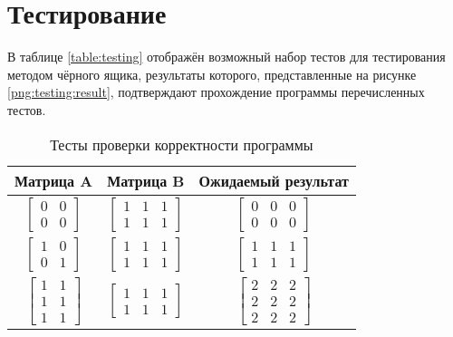         
    \section{Тестирование}
        В таблице \ref{table:testing} отображён возможный набор тестов
        для тестирования методом чёрного ящика, результаты которого, 
        представленные на рисунке \ref{png:testing:result}, подтверждают
        прохождение программы перечисленных тестов.

        \begin{table}[]
            \caption{Тесты проверки корректности программы}
            \centering
            \begin{tabular}{|c|c|c|}
                \hline
                Матрица A                                                & Матрица B                                              & Ожидаемый результат                                    \\ \hline
                $\begin{bmatrix} 0 & 0 \\ 0 & 0 \end{bmatrix}$           & $\begin{bmatrix} 1 & 1 & 1 \\ 1 & 1 & 1 \end{bmatrix}$ & $\begin{bmatrix} 0 & 0 & 0 \\ 0 & 0 & 0 \end{bmatrix}$ \\ \hline
                $\begin{bmatrix} 1 & 0 \\ 0 & 1 \end{bmatrix}$           & $\begin{bmatrix} 1 & 1 & 1 \\ 1 & 1 & 1 \end{bmatrix}$ & $\begin{bmatrix} 1 & 1 & 1 \\ 1 & 1 & 1 \end{bmatrix}$ \\ \hline
                $\begin{bmatrix} 1 & 1 \\ 1 & 1 \\ 1 & 1 \end{bmatrix}$  & $\begin{bmatrix} 1 & 1 & 1 \\ 1 & 1 & 1 \end{bmatrix}$ & $\begin{bmatrix} 2 & 2 & 2 \\ 2 & 2 & 2 \\ 2 & 2 & 2 \end{bmatrix}$ \\ \hline

\end{tabular}
\end{table}
